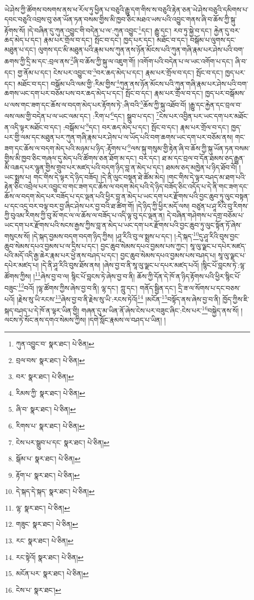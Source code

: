 ཡེ་ཤེས་ཀྱི་ཚོགས་བསགས་ནས་ཕ་རོལ་ཏུ་ཕྱིན་པ་བཅུའི་རྒྱུ་དག་གིས་ས་བཅུའི་རྟེན་ཅན་ཡེ་ཤེས་བཅུའི་དམིགས་པ་དབང་བཅུའི་འབྲས་བུ་ཅན་ཡོན་ཏན་བསམ་གྱིས་མི་ཁྱབ་ཅིང་མཐའ་ཡས་པའི་འབྱུང་གནས་ཞི་བ་ཆོས་ཀྱི་སྐུ་རྟོགས་སོ། །དེ་བཞིན་དུ་ཀུན་འབྱུང་གི་བདེན་པ་ལ་:ཀུན་འབྱུང་\footnote{ཀུན་འབྱུང་བ་  སྣར་ཐང་།  པེ་ཅིན། }དང་། རྒྱུ་དང་། རབ་ཏུ་སྐྱེ་བ་དང་། རྐྱེན་དུ་བར་ཆད་མེད་པ་དང་། རྣམ་པར་གྲོལ་བ་དང་། སྤོང་བ་དང་། ཁྱད་པར་དང་། མཐོང་བ་དང་། བསྒོམ་པ་ལུགས་དང་མཐུན་པ་དང་། ལུགས་དང་མི་མཐུན་པའི་རྣམ་པས་ཀུན་ནས་ཉོན་མོངས་པའི་ཀུན་གཞི་རྣམ་པར་ཤེས་པའི་བག་ཆགས་ཀྱི་དྲི་མ་དང་:བྲལ་ནས་\footnote{བྲལ་བས་  སྣར་ཐང་།  པེ་ཅིན། }ཞི་བ་ཆོས་ཀྱི་སྐུ་ལ་འཇུག་གོ། །འགོག་པའི་བདེན་པ་ལ་ཡང་འགོག་པ་དང་། ཞི་བ་དང་། གྱ་ནོམ་པ་དང་། ངེས་པར་འབྱུང་བ་\footnote{བར་  སྣར་ཐང་།  པེ་ཅིན། }བར་ཆད་མེད་པ་དང་། རྣམ་པར་གྲོལ་བ་དང་། སྤོང་བ་དང་། ཁྱད་པར་དང་། མཐོང་བ་དང་། བསྒོམ་པའི་ལམ་གྱི་:རིམ་གྱིས་\footnote{རིམས་ཀྱི་  སྣར་ཐང་།  པེ་ཅིན། }ཀུན་ནས་ཉོན་མོངས་པའི་ཀུན་གཞི་རྣམ་པར་ཤེས་པའི་བག་ཆགས་ཡང་དག་པར་བཅོམ་པས་བར་ཆད་མེད་པ་དང་། སྤོང་བ་དང་། རྣམ་པར་གྲོལ་བ་དང་། ཁྱད་པར་བསྒོམས་པ་ལས་གང་ཟག་དང་ཆོས་ལ་བདག་མེད་པར་རྟོགས་ཏེ་:ཞི་བའི་\footnote{ཞི་བ་  སྣར་ཐང་།  པེ་ཅིན། }ཆོས་ཀྱི་སྐུ་འཐོབ་བོ། །རྒྱུ་དང་རྐྱེན་དང་བྲལ་བ་ལས་ལམ་གྱི་བདེན་པ་ལ་ཡང་ལམ་དང་། :རིག་པ་\footnote{རིགས་པ་  སྣར་ཐང་།  པེ་ཅིན། }དང་། སྒྲུབ་པ་དང་། \footnote{ངེས་པར་སྒྲུབ་པ་དང་  སྣར་ཐང་།  པེ་ཅིན། }ངེས་པར་འབྱིན་པར་ཡང་དག་པར་མཐོང་ན་འདི་ལྟར་མཐོང་བ་དང་། :བསྒོམ་པ་\footnote{སྒོམ་པ་  སྣར་ཐང་།  པེ་ཅིན། }དང་། བར་ཆད་མེད་པ་དང་། སྤོང་བ་དང་། རྣམ་པར་གྲོལ་བ་དང་། ཁྱད་པར་གྱི་ལམ་དང་མཐུན་པར་ཀུན་གཞི་རྣམ་པར་ཤེས་པ་ལ་ཡོད་པའི་བག་ཆགས་ཡང་དག་པར་བཅོམ་ནས། གང་ཟག་དང་ཆོས་ལ་བདག་མེད་པའི་མཉམ་པ་ཉིད་:རྟོགས་པ་\footnote{རྟོག་པ་  སྣར་ཐང་།  པེ་ཅིན། }ལས་སྐུ་གསུམ་གྱི་རྟེན་ཞི་བ་ཆོས་ཀྱི་སྐུ་ཡོན་ཏན་བསམ་གྱིས་མི་ཁྱབ་ཅིང་གཞལ་དུ་མེད་པའི་ཚོགས་ཅན་ཐོག་མ་དང་། བར་དང་། ཐ་མ་དང་བྲལ་བ་དོན་ཐམས་ཅད་རྒྱུན་མི་འཆད་པར་ལྷུན་གྱིས་གྲུབ་པར་མཛད་པའི་བདག་ཉིད་བླ་ན་མེད་པ་དང་། ཐམས་ཅད་མཁྱེན་པ་ཉིད་ཐོབ་བོ། །ཡང་སྨྲས་པ། གང་གིས་དེ་ལྟར་དེ་ཉིད་བཟོད། །དེ་ནི་ལུང་བསྟན་ཐེ་ཚོམ་མེད། །གང་གིས་དེ་ལྟར་བཤད་མ་ཐག་པའི་རྟེན་ཅིང་འབྲེལ་པར་འབྱུང་བ་གང་ཟག་དང་ཆོས་ལ་བདག་མེད་པའི་དེ་ཉིད་བཟོད་ཅིང་འདོད་པ་དེ་ནི་གང་ཟག་དང་ཆོས་ལ་བདག་མེད་པར་བཟོད་པ་དང་ལྡན་པའི་ཕྱིར་བླ་ན་མེད་པ་ཡང་དག་པར་རྫོགས་པའི་བྱང་ཆུབ་ཏུ་ལུང་བསྟན་པ་དང་འདྲ་བར་བལྟ་བར་བྱ་ཞིང་ཤེས་པར་བྱ་བའི་ཐ་ཚིག་གོ། །དེ་ཉིད་ཀྱི་ཕྱིར་མདོ་ལས། བཙུན་པ་ཤཱ་རིའི་བུ་རིགས་ཀྱི་བུའམ་རིགས་ཀྱི་བུ་མོ་གང་ལ་ལ་ཆོས་ལ་བཟོད་པ་འདི་ལྟ་བུ་དང་ལྡན་ན། དེ་བཞིན་གཤེགས་པ་དགྲ་བཅོམ་པ་ཡང་དག་པར་རྫོགས་པའི་སངས་རྒྱས་ཀྱིས་བླ་ན་མེད་པ་ཡང་དག་པར་རྫོགས་པའི་བྱང་ཆུབ་ཏུ་ལུང་སྟོན་ཏོ་ཞེས་གསུངས་སོ། །དེ་སྐད་བྱམས་བདག་བདག་ཉིད་ཀྱིས། །ཤཱ་རིའི་བུ་ལ་སྨྲས་པ་དང་། །:དེ་སྐད་\footnote{དེ་སྐད་དེ་སྐད་  སྣར་ཐང་།  པེ་ཅིན། }དུ་ཤཱ་རིའི་བུས་བྱང་ཆུབ་སེམས་དཔའ་བྱམས་པ་ལ་དྲིས་པ་དང་། བྱང་ཆུབ་སེམས་དཔའ་བྱམས་པས་ཀྱང་། སཱ་ལུ་ལྗང་པ་དཔེར་མཛད་པའི་མདོ་འདི་རྒྱ་ཆེར་རྣམ་པར་ཕྱེ་ནས་བཤད་པ་དང་། བྱང་ཆུབ་སེམས་དཔའ་བྱམས་པས་བཤད་པ། སཱ་ལུ་ལྗང་པ་དཔེར་མཛད་པ། །དེ་ནི་ཤཱ་རིའི་བུས་ཐོས་ནས། །ཞེས་བྱ་བ་ནི་སཱ་ལུ་ལྗང་པ་དཔར་མཛད་པའོ། །སྙིང་པོ་བླངས་ཏེ་:ལྷ་ཚོགས་ཀྱིས། །\footnote{ལྷ་  སྣར་ཐང་།  པེ་ཅིན། }ཞེས་བྱ་བ་ལ། སྙིང་པོ་བླངས་ཏེ་ཞེས་བྱ་བ་ནི། ཆོས་ཀྱི་དོན་དེ་ཁོ་ན་ཉིད་རྟོགས་པའི་ཕྱིར་སྙིང་པོ་བཟུང་\footnote{གཟུང་  སྣར་ཐང་།  པེ་ཅིན། }བའོ། །ལྷ་ཚོགས་ཀྱིས་ཞེས་བྱ་བ་ནི། ལྷ་དང་། ཀླུ་དང་། གནོད་སྦྱིན་དང་། དྲི་ཟ་ལ་སོགས་པ་དང་བཅས་པའོ། །རྗེས་སུ་ཡི་རངས་\footnote{རང་  སྣར་ཐང་།  པེ་ཅིན། }ཞེས་བྱ་བ་ནི་རྗེས་སུ་ཡི་:རངས་ཏེའོ།\footnote{རང་སྟེའོ།  སྣར་ཐང་།  པེ་ཅིན། } །མངོན་\footnote{མངོན་པར་  སྣར་ཐང་།  པེ་ཅིན། }བསྟོད་ནས་ཞེས་བྱ་བ་ནི། ཁྱོད་ཀྱིས་ཇི་སྐད་བཤད་པ་དེ་ཁོ་ན་ལྟར་ཡིན་གྱི། གཞན་དུ་མ་ཡིན་ནོ་ཞེས་ངེས་པར་བཟུང་ཞིང་:ངེས་པར་\footnote{ངེས་པ་  སྣར་ཐང་། }བསྐྱེད་ནས་སོ། །ལངས་ཏེ་སོང་ནས་དགའ་སེམས་ཀྱིས། །དགེ་སློང་རྣམས་ལ་བཤད་པ་ཡིན། །
